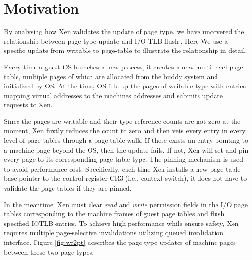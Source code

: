 \section{Motivation} \label{sec:moti}



By analysing how Xen validates the update of page type, we have uncovered the relationship between page type update and I/O TLB flush . Here We use a specific update from writable to page-table to illustrate the relationship in detail.

Every time a guest OS launches a new process, it creates a new multi-level page table, multiple pages of which are allocated from the buddy system and initialized by OS. At the time, OS fills up the pages of writable-type with entries mapping virtual addresses to the machines addresses and submits update requests to Xen.

Since the pages are writable and their type reference counts are not zero at the moment, Xen firstly reduces the count to zero and then vets every entry in every level of page tables through a page table walk. If there exists an entry pointing to a machine page beyond the OS, then the update fails. If not, Xen will set and pin every page to its corresponding page-table type. The pinning mechanism is used to avoid performance cost. Specifically, each time Xen installs a new page table base pointer to the control register CR3 (i.e., context switch), it does not have to validate the page tables if they are pinned.

In the meantime, Xen must clear \emph{read} and \emph{write} permission fields in the I/O page tables corresponding to the machine frames of guest page tables and flush specified IOTLB entries. To achieve high performance while ensure safety, Xen requires multiple page-selective invalidations utilizing queued invalidation interface. Figure \ref{fig:wr2pt} describes the page type updates of machine pages between these two page types.

